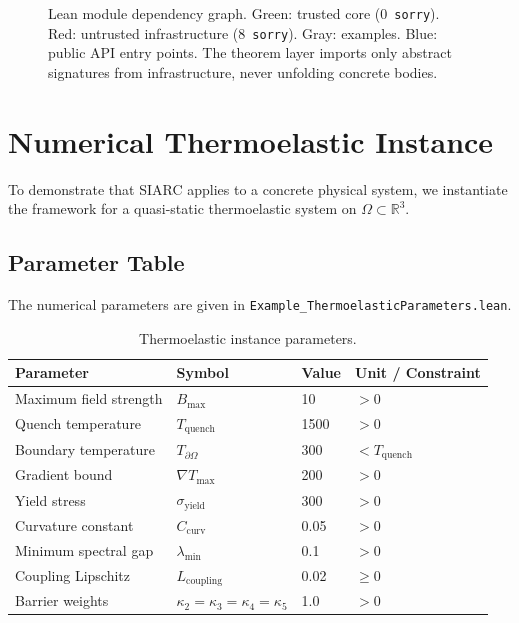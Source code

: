 \documentclass[11pt,a4paper]{article}
\theoremstyle{plain}
\theoremstyle{definition}
\theoremstyle{remark}
\newcommand{\R}{\mathbb{R}}
\newcommand{\kk}{\kappa}
\newcommand{\sorry}{\texttt{sorry}}
\newcommand{\leaninline}[1]{\texttt{#1}}
\begin{document}
\begin{figure}[ht]
\caption{Lean module dependency graph.  Green: trusted core (0~\sorry{}).
Red: untrusted infrastructure (8~\sorry{}).  Gray: examples.
Blue: public API entry points.  The theorem layer imports only
abstract signatures from infrastructure, never unfolding concrete bodies.}
\label{fig:modules}
\end{figure}


\section{Numerical Thermoelastic Instance}\label{sec:thermo}

To demonstrate that SIARC applies to a concrete physical system, we
instantiate the framework for a quasi-static thermoelastic system on
$\Omega \subset \R^3$.

\subsection{Parameter Table}

The numerical parameters are given in
\leaninline{Example\_ThermoelasticParameters.lean}.

\begin{table}[ht]
\centering
\caption{Thermoelastic instance parameters.}
\label{tab:params}
\begin{tabular}{llll}
\toprule
Parameter & Symbol & Value & Unit / Constraint \\
\midrule
Maximum field strength & $B_{\max}$ & 10 & $> 0$ \\
Quench temperature & $T_{\mathrm{quench}}$ & 1500 & $> 0$ \\
Boundary temperature & $T_{\partial\Omega}$ & 300 & $< T_{\mathrm{quench}}$ \\
Gradient bound & $\nabla T_{\max}$ & 200 & $> 0$ \\
Yield stress & $\sigma_{\mathrm{yield}}$ & 300 & $> 0$ \\
Curvature constant & $C_{\mathrm{curv}}$ & 0.05 & $> 0$ \\
Minimum spectral gap & $\lambda_{\min}$ & 0.1 & $> 0$ \\
Coupling Lipschitz & $L_{\mathrm{coupling}}$ & 0.02 & $\ge 0$ \\
Barrier weights & $\kk_2 = \kk_3 = \kk_4 = \kk_5$ & 1.0 & $> 0$ \\
\bottomrule
\end{tabular}
\end{table}
\end{document}

